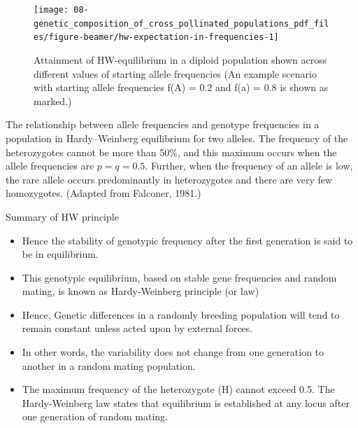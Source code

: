 \documentclass[11pt,ignorenonframetext,aspectratio=169]{beamer}
\providecommand{\tightlist}{%
  \setlength{\itemsep}{0pt}\setlength{\parskip}{0pt}}
\begin{document}
\begin{frame}{}
\protect\hypertarget{section-10}{}
\begin{figure}[center]
\texttt{[image: 08-genetic\_composition\_of\_cross\_pollinated\_populations\_pdf\_files/figure-beamer/hw-expectation-in-frequencies-1]} \caption{Attainment of HW-equilibrium in a diploid population shown across different values of starting allele frequencies (An example scenario with starting allele frequencies f(A) = 0.2 and f(a) = 0.8 is shown as marked.)}\label{fig:hw-expectation-in-frequencies}
\end{figure}

The relationship between allele frequencies and genotype frequencies in
a population in Hardy--Weinberg equilibrium for two alleles. The
frequency of the heterozygotes cannot be more than 50\%, and this
maximum occurs when the allele frequencies are \(p=q=0.5\). Further,
when the frequency of an allele is low, the rare allele occurs
predominantly in heterozygotes and there are very few homozygotes.
(Adapted from Falconer, 1981.)
\end{frame}

\begin{frame}{Summary of HW principle}
\protect\hypertarget{summary-of-hw-principle}{}
\begin{itemize}
\tightlist
\item
  Hence the stability of genotypic frequency after the first generation
  is said to be in equilibrium.
\item
  This genotypic equilibrium, based on stable gene frequencies and
  random mating, is known as Hardy-Weinberg principle (or law)
\item
  Hence, Genetic differences in a randomly breeding population will tend
  to remain constant unless acted upon by external forces.
\item
  In other words, the variability does not change from one generation to
  another in a random mating population.
\item
  The maximum frequency of the heterozygote (H) cannot exceed 0.5. The
  Hardy-Weinberg law states that equilibrium is established at any locus
  after one generation of random mating.
\end{itemize}
\end{frame}
\end{document}
